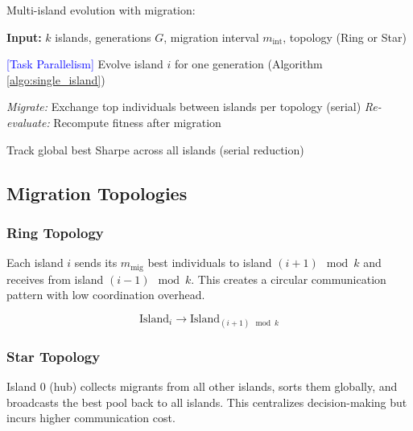 \documentclass[12pt,a4paper]{article}
\begin{document}
Multi-island evolution with migration:

\begin{algorithm}
	\caption{Island Model GA with Migration (Main Loop)}
	\label{algo:imga_main}
	\begin{algorithmic}[1]
		\State \textbf{Input:} $k$ islands, generations $G$, migration interval $m_{\text{int}}$, topology (Ring or Star)
		
			 \quad \textcolor{blue}{[Task Parallelism]}
				\State Evolve island $i$ for one generation (Algorithm \ref{algo:single_island})
			\EndFor
			
				\State \textit{Migrate:} Exchange top individuals between islands per topology \quad (serial)
				\State \textit{Re-evaluate:} Recompute fitness after migration 
			\EndIf
			
			\State Track global best Sharpe across all islands \quad (serial reduction)
		\EndFor
	\end{algorithmic}
\end{algorithm}

\subsection{Migration Topologies}

\subsubsection{Ring Topology}

Each island $i$ sends its $m_{\text{mig}}$ best individuals to island $(i+1) \mod k$ and receives from island $(i-1) \mod k$. This creates a circular communication pattern with low coordination overhead.

\begin{equation}
\text{Island}_i \rightarrow \text{Island}_{(i+1) \mod k}
\end{equation}

\subsubsection{Star Topology}

Island 0 (hub) collects migrants from all other islands, sorts them globally, and broadcasts the best pool back to all islands. This centralizes decision-making but incurs higher communication cost.
\end{document}
